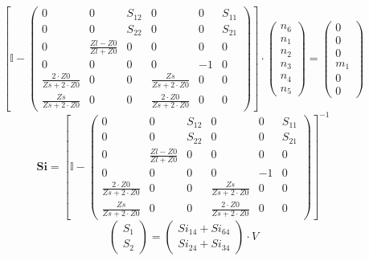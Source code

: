 \[ \left[ \mathbb{I}  - \left(\begin{array}{cccccc} 0 & 0 & S_{12} & 0
& 0 & S_{11} \\ 0 & 0 & S_{22} & 0 & 0 & S_{21} \\ 0 & \frac{ Zl -Z0}{
Zl +Z0} & 0 & 0 & 0 & 0 \\ 0 & 0 & 0 & 0 & -1 & 0 \\ \frac{2\cdot
Z0}{Zs+2\cdot Z0} & 0 & 0 & \frac{Zs}{Zs+2\cdot Z0} & 0 & 0 \\
\frac{Zs}{Zs+2\cdot Z0} & 0 & 0 & \frac{2\cdot Z0}{Zs+2\cdot Z0} & 0 &
0 \end{array}\right)\right] \cdot \left(\begin{array}{c} n_{6} \\
n_{1} \\ n_{2} \\ n_{3} \\ n_{4} \\ n_{5} \end{array}\right) =
\left(\begin{array}{c} 0 \\ 0 \\ 0 \\ m_{1} \\ 0 \\ 0
\end{array}\right) \]
\[ \mathbf{Si} = \left[ \mathbb{I}  - \left(\begin{array}{cccccc} 0 &
0 & S_{12} & 0 & 0 & S_{11} \\ 0 & 0 & S_{22} & 0 & 0 & S_{21} \\ 0 &
\frac{ Zl -Z0}{ Zl +Z0} & 0 & 0 & 0 & 0 \\ 0 & 0 & 0 & 0 & -1 & 0 \\
\frac{2\cdot Z0}{Zs+2\cdot Z0} & 0 & 0 & \frac{Zs}{Zs+2\cdot Z0} & 0 &
0 \\ \frac{Zs}{Zs+2\cdot Z0} & 0 & 0 & \frac{2\cdot Z0}{Zs+2\cdot Z0}
& 0 & 0 \end{array}\right) \right]^{-1} \]
\[ \left(\begin{array}{c} S_{1} \\ S_{2}
\end{array}\right)=\left(\begin{array}{c} Si_{14} + Si_{64} \\ Si_{24}
+ Si_{34} \end{array}\right)\cdot V \]
